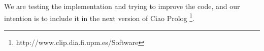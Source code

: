 \documentclass{llncs}
\begin{document}
We are testing the implementation and trying to improve the code, and
our intention is to include it in the next version of Ciao Prolog
\footnote{http://www.clip.dia.fi.upm.es/Software}.
  


 \begin{small}

     
    

 \end{small}


\end{document}
